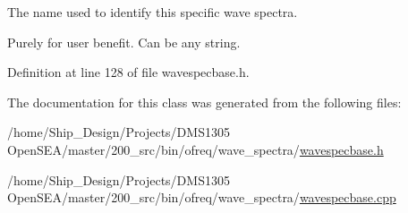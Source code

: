 The name used to identify this specific wave spectra. 

Purely for user benefit. Can be any string. 

Definition at line 128 of file wavespecbase.\-h.



The documentation for this class was generated from the following files\-:\begin{DoxyCompactItemize}
\item 
/home/\-Ship\-\_\-\-Design/\-Projects/\-D\-M\-S1305 Open\-S\-E\-A/master/200\-\_\-src/bin/ofreq/wave\-\_\-spectra/\hyperlink{wavespecbase_8h}{wavespecbase.\-h}\item 
/home/\-Ship\-\_\-\-Design/\-Projects/\-D\-M\-S1305 Open\-S\-E\-A/master/200\-\_\-src/bin/ofreq/wave\-\_\-spectra/\hyperlink{wavespecbase_8cpp}{wavespecbase.\-cpp}\end{DoxyCompactItemize}
